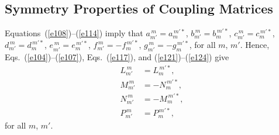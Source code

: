 \documentclass[12pt,prb,aps]{revtex4-1}
\begin{document}
\subsection{Symmetry Properties of Coupling Matrices}
Equations~(\ref{e108})--(\ref{e114}) imply that
$a_{m'}^{\,m}= a_m^{\,m'\ast}$,
$b_{m'}^{\,m}= b_m^{\,m'\ast}$, 
$c_{m'}^{\,m}= c_m^{\,m'\ast}$,
$d_{m'}^{\,m}= d_m^{\,m'\ast}$,
$e_{m'}^{\,m}= e_m^{\,m'\ast}$,
$f_{m'}^{\,m}= -f_m^{\,m'\ast}$,
$g_{m'}^{\,m}= -g_m^{\,m'\ast}$,
for all $m$, $m'$.
 Hence, Eqs.~(\ref{e104})--(\ref{e107}), Eqs.~(\ref{e117}), and (\ref{e121})--(\ref{e124}) give
\begin{align}
L_{m'}^{\,m}&= L_m^{\,m'\ast},\label{e137}\\[0.5ex]
M_{m'}^{\,m}&=-N_m^{\,m'\ast},\\[0.5ex]
N_{m'}^{\,m}&=-M_m^{\,m'\ast},\label{e139}\\[0.5ex]
P_{m'}^{\,m}&= P_m^{\,m'\ast},\label{e140}
\end{align}
for all $m$, $m'$. 
\end{document}
